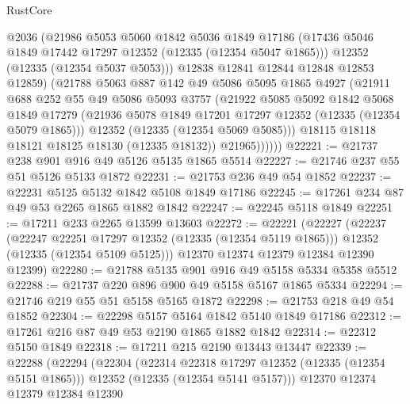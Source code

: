 \begin{lexlean}{RustCore}
\begin{coremodule}
                @2036
                (@21986
                  @5053
                  @5060
                  @1842
                  @5036
                  @1849
                  @17186
                  (@17436 @5046 @1849 @17442 @17297 @12352 (@12335 (@12354 @5047 @1865)))
                  @12352
                  (@12335 (@12354 @5037 @5053)))
                @12838
                @12841
                @12844
                @12848
                @12853
                @12859)
              (@21788
                @5063
                @887
                @142
                @49
                @5086
                @5095
                @1865
                @4927
                (@21911
                  @688
                  @252
                  @55
                  @49
                  @5086
                  @5093
                  @3757
                  (@21922
                    @5085
                    @5092
                    @1842
                    @5068
                    @1849
                    @17279
                    (@21936 @5078 @1849 @17201 @17297 @12352 (@12335 (@12354 @5079 @1865)))
                    @12352
                    (@12335 (@12354 @5069 @5085)))
                  @18115
                  @18118
                  @18121
                  @18125
                  @18130
                  (@12335 @18132))
                @21965))))))
@22221 := @21737 @238 @901 @916 @49 @5126 @5135 @1865 @5514
@22227 := @21746 @237 @55 @51 @5126 @5133 @1872
@22231 := @21753 @236 @49 @54 @1852
@22237 := @22231 @5125 @5132 @1842 @5108 @1849 @17186
@22245 := @17261 @234 @87 @49 @53 @2265 @1865 @1882 @1842
@22247 := @22245 @5118 @1849
@22251 := @17211 @233 @2265 @13599 @13603
@22272 := @22221
    (@22227
      (@22237
        (@22247 @22251 @17297 @12352 (@12335 (@12354 @5119 @1865)))
        @12352
        (@12335 (@12354 @5109 @5125)))
      @12370
      @12374
      @12379
      @12384
      @12390
      @12399)
@22280 := @21788 @5135 @901 @916 @49 @5158 @5334 @5358 @5512
@22288 := @21737 @220 @896 @900 @49 @5158 @5167 @1865 @5334
@22294 := @21746 @219 @55 @51 @5158 @5165 @1872
@22298 := @21753 @218 @49 @54 @1852
@22304 := @22298 @5157 @5164 @1842 @5140 @1849 @17186
@22312 := @17261 @216 @87 @49 @53 @2190 @1865 @1882 @1842
@22314 := @22312 @5150 @1849
@22318 := @17211 @215 @2190 @13443 @13447
@22339 := @22288
    (@22294
      (@22304
        (@22314 @22318 @17297 @12352 (@12335 (@12354 @5151 @1865)))
        @12352
        (@12335 (@12354 @5141 @5157)))
      @12370
      @12374
      @12379
      @12384
      @12390

\end{coremodule}
\end{lexlean}
